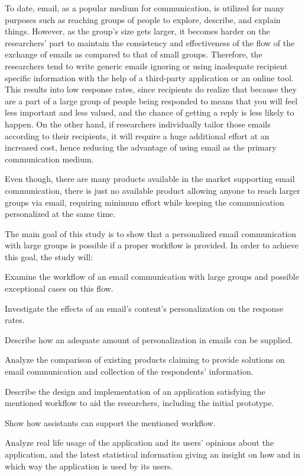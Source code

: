 To date, email, as a popular medium for communication, is utilized for many purposes such as reaching groups of people to explore, describe, and explain things. However, as the group's size gets larger, it becomes harder on the researchers' part to maintain the consistency and effectiveness of the flow of the exchange of emails as compared to that of small groups. Therefore, the researchers tend to write generic emails ignoring or using inadequate recipient specific information with the help of a third-party application or an online tool. This results into low response rates, since recipients do realize that because they are a part of a large group of people being responded to means that you will feel less important and less valued, and the chance of getting a reply is less likely to happen. On the other hand, if researchers individually tailor those emails according to their recipients, it will require a huge additional effort at an increased cost, hence reducing the advantage of using email as the primary communication medium.
\vspace{1cm}

Even though, there are many products available in the market supporting email communication, there is just no available product allowing anyone to reach larger groups via email, requiring minimum effort while keeping the communication personalized at the same time.
\vspace{1cm}

The main goal of this study is to show that a personalized email communication with large groups is possible if a proper workflow is provided. In order to achieve this goal, the study will:

\begin{compactenum}
	\item Examine the workflow of an email communication with large groups and possible exceptional cases on this flow.
	\item Investigate the effects of an email's content's personalization on the response rates.
	\item Describe how an adequate amount of personalization in emails can be supplied.
	\item Analyze the comparison of existing products claiming to provide solutions on email communication and collection of the respondents' information.
	\item Describe the design and implementation of an application satisfying the mentioned workflow to aid the researchers, including the initial prototype.
	\item Show how assistants can support the mentioned workflow. 
	\item Analyze real life usage of the application and its users' opinions about the application, and the latest statistical information giving an insight on how and in which way the application is used by its users.
\end{compactenum}
\vspace{1cm}


